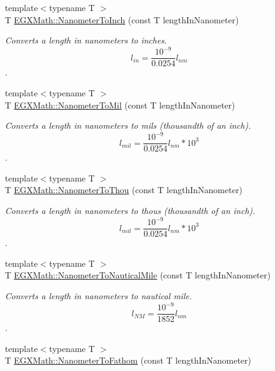 \begin{DoxyCompactItemize}
{\footnotesize template$<$typename T $>$ }\\T \mbox{\hyperlink{group___e_g_x_math-_conversions-_length_conversions-_s_i-_nanometer-_imperial_ga8b72dde5616da5be31e8054f1facc501}{E\+G\+X\+Math\+::\+Nanometer\+To\+Inch}} (const T length\+In\+Nanometer)
\begin{DoxyCompactList}\small\item\em Converts a length in nanometers to inches. \[ l_{in}= \frac{10^{-9}}{0.0254} l_{nm} \]. \end{DoxyCompactList}\item 
{\footnotesize template$<$typename T $>$ }\\T \mbox{\hyperlink{group___e_g_x_math-_conversions-_length_conversions-_s_i-_nanometer-_imperial_gacfd62a86ae9a5085569840f3b7bbdb3e}{E\+G\+X\+Math\+::\+Nanometer\+To\+Mil}} (const T length\+In\+Nanometer)
\begin{DoxyCompactList}\small\item\em Converts a length in nanometers to mils (thousandth of an inch). \[ l_{mil}= \frac{10^{-9}}{0.0254} l_{nm} * 10^{3} \]. \end{DoxyCompactList}\item 
{\footnotesize template$<$typename T $>$ }\\T \mbox{\hyperlink{group___e_g_x_math-_conversions-_length_conversions-_s_i-_nanometer-_imperial_ga4c714a8d3ab333da358dafe181ebdcc4}{E\+G\+X\+Math\+::\+Nanometer\+To\+Thou}} (const T length\+In\+Nanometer)
\begin{DoxyCompactList}\small\item\em Converts a length in nanometers to thous (thousandth of an inch). \[ l_{mil}= \frac{10^{-9}}{0.0254} l_{nm} * 10^{3} \]. \end{DoxyCompactList}\item 
{\footnotesize template$<$typename T $>$ }\\T \mbox{\hyperlink{group___e_g_x_math-_conversions-_length_conversions-_s_i-_nanometer-_nautical_gac428c495bff87ba53c856395a7410fc3}{E\+G\+X\+Math\+::\+Nanometer\+To\+Nautical\+Mile}} (const T length\+In\+Nanometer)
\begin{DoxyCompactList}\small\item\em Converts a length in nanometers to nautical mile. \[ l_{NM}= \frac{10^{-9}}{1852} l_{nm} \]. \end{DoxyCompactList}\item 
{\footnotesize template$<$typename T $>$ }\\T \mbox{\hyperlink{group___e_g_x_math-_conversions-_length_conversions-_s_i-_nanometer-_nautical_ga934c7c5c17c283b51e1551b9731f05b6}{E\+G\+X\+Math\+::\+Nanometer\+To\+Fathom}} (const T length\+In\+Nanometer)

\end{DoxyCompactItemize}
